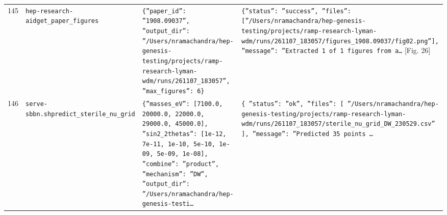 \documentclass[11pt,a4paper]{article}
\begin{document}
\begin{longtable}{@{}p{}p{}p{}p{}@{}}
145 & \texttt{hep-research-aid}\newline\texttt{get\_\allowbreak{}paper\_\allowbreak{}figures} & \texttt{\{''paper\_\allowbreak{}id'':\allowbreak{} ''1908.09037'',\allowbreak{} ''output\_\allowbreak{}dir'':\allowbreak{} ''/\allowbreak{}Users/\allowbreak{}nramachandra/\allowbreak{}hep-genesis-testing/\allowbreak{}projects/\allowbreak{}ramp-research-lyman-wdm/\allowbreak{}runs/\allowbreak{}261107\_\allowbreak{}183057'',\allowbreak{} ''max\_\allowbreak{}figures'':\allowbreak{} 6\}\allowbreak{}} & \texttt{\{''status'':\allowbreak{} ''success'',\allowbreak{} ''files'':\allowbreak{} [''/\allowbreak{}Users/\allowbreak{}nramachandra/\allowbreak{}hep-genesis-testing/\allowbreak{}projects/\allowbreak{}ramp-research-lyman-wdm/\allowbreak{}runs/\allowbreak{}261107\_\allowbreak{}183057/\allowbreak{}figures\_\allowbreak{}1908.09037/\allowbreak{}fig02.png'']\allowbreak{},\allowbreak{} ''message'':\allowbreak{} ''Extracted 1 of 1 figures from a\ldots{}\allowbreak{}} [Fig. 26] \\
146 & \texttt{serve-sbbn.sh}\newline\texttt{predict\_\allowbreak{}sterile\_\allowbreak{}nu\_\allowbreak{}grid} & \texttt{\{''masses\_\allowbreak{}eV'':\allowbreak{} [7100.0,\allowbreak{} 20000.0,\allowbreak{} 22000.0,\allowbreak{} 29000.0,\allowbreak{} 45000.0]\allowbreak{},\allowbreak{} ''sin2\_\allowbreak{}2thetas'':\allowbreak{} [1e-12,\allowbreak{} 7e-11,\allowbreak{} 1e-10,\allowbreak{} 5e-10,\allowbreak{} 1e-09,\allowbreak{} 5e-09,\allowbreak{} 1e-08]\allowbreak{},\allowbreak{} ''combine'':\allowbreak{} ''product'',\allowbreak{} ''mechanism'':\allowbreak{} ''DW'',\allowbreak{} ''output\_\allowbreak{}dir'':\allowbreak{} ''/\allowbreak{}Users/\allowbreak{}nramachandra/\allowbreak{}hep-genesis-testi\ldots{}\allowbreak{}} & \texttt{\{   ''status'':\allowbreak{} ''ok'',\allowbreak{}   ''files'':\allowbreak{} [     ''/\allowbreak{}Users/\allowbreak{}nramachandra/\allowbreak{}hep-genesis-testing/\allowbreak{}projects/\allowbreak{}ramp-research-lyman-wdm/\allowbreak{}runs/\allowbreak{}261107\_\allowbreak{}183057/\allowbreak{}sterile\_\allowbreak{}nu\_\allowbreak{}grid\_\allowbreak{}DW\_\allowbreak{}230529.csv''   ]\allowbreak{},\allowbreak{}   ''message'':\allowbreak{} ''Predicted 35 points \ldots{}\allowbreak{}} \\

\end{longtable}
\end{document}
